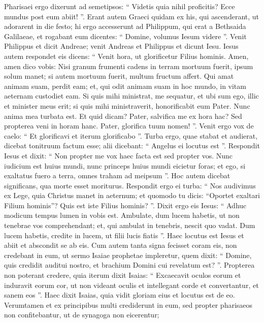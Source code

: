 \begin{biblechapter}
\begin{biblechapter}
\begin{biblechapter}
\begin{biblechapter}
\begin{biblechapter}
\begin{biblechapter}
\begin{biblechapter}
\begin{biblechapter}
\begin{biblechapter}
\begin{biblechapter}
\begin{biblechapter}
\begin{biblechapter}
\verse Pharisaei ergo dixerunt ad semetipsos: “ Videtis quia nihil proficitis? Ecce mundus post eum abiit! ”.
 \verse Erant autem Graeci quidam ex his, qui ascenderant, ut adorarent in die festo; 
\verse hi ergo accesserunt ad Philippum, qui erat a Bethsaida Galilaeae, et rogabant eum dicentes: “ Domine, volumus Iesum videre ”. 
\verse Venit Philippus et dicit Andreae; venit Andreas et Philippus et dicunt Iesu. 
\verse Iesus autem respondet eis dicens: “ Venit hora, ut glorificetur Filius hominis. 
\verse Amen, amen dico vobis: Nisi granum frumenti cadens in terram mortuum fuerit, ipsum solum manet; si autem mortuum fuerit, multum fructum affert. 
\verse Qui amat animam suam, perdit eam; et, qui odit animam suam in hoc mundo, in vitam aeternam custodiet eam. 
\verse Si quis mihi ministrat, me sequatur, et ubi sum ego, illic et minister meus erit; si quis mihi ministraverit, honorificabit eum Pater. 
\verse Nunc anima mea turbata est. Et quid dicam? Pater, salvifica me ex hora hac? Sed propterea veni in horam hanc. 
\verse Pater, glorifica tuum nomen! ”. Venit ergo vox de caelo: “ Et glorificavi et iterum glorificabo ”. 
\verse Turba ergo, quae stabat et audierat, dicebat tonitruum factum esse; alii dicebant: “ Angelus ei locutus est ”. 
\verse Respondit Iesus et dixit: “ Non propter me vox haec facta est sed propter vos. 
\verse Nunc iudicium est huius mundi, nunc princeps huius mundi eicietur foras; 
\verse et ego, si exaltatus fuero a terra, omnes traham ad meipsum ”. 
\verse Hoc autem dicebat significans, qua morte esset moriturus. 
\verse Respondit ergo ei turba: “ Nos audivimus ex Lege, quia Christus manet in aeternum; et quomodo tu dicis: “Oportet exaltari Filium hominis”? Quis est iste Filius hominis? ”. 
\verse Dixit ergo eis Iesus: “ Adhuc modicum tempus lumen in vobis est. Ambulate, dum lucem habetis, ut non tenebrae vos comprehendant; et, qui ambulat in tenebris, nescit quo vadat. 
 \verse Dum lucem habetis, credite in lucem, ut filii lucis fiatis ”. Haec locutus est Iesus et abiit et abscondit se ab eis.
 \verse Cum autem tanta signa fecisset coram eis, non credebant in eum, 
\verse ut sermo Isaiae prophetae impleretur, quem dixit:
 “ Domine, quis credidit auditui nostro,
 et brachium Domini cui revelatum est? ”.
 \verse Propterea non poterant credere, quia iterum dixit Isaias:
 \verse “ Excaecavit oculos eorum
 et induravit eorum cor,
 ut non videant oculis
 et intellegant corde et convertantur,
 et sanem eos ”.
 \verse Haec dixit Isaias, quia vidit gloriam eius et locutus est de eo. 
\verse Verumtamen et ex principibus multi crediderunt in eum, sed propter pharisaeos non confitebantur, ut de synagoga non eicerentur; 

\end{biblechapter}
\end{biblechapter}
\end{biblechapter}
\end{biblechapter}
\end{biblechapter}
\end{biblechapter}
\end{biblechapter}
\end{biblechapter}
\end{biblechapter}
\end{biblechapter}
\end{biblechapter}
\end{biblechapter}
